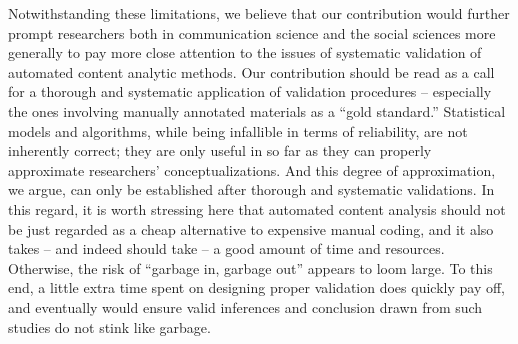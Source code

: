\documentclass[man, floatsintext, 12pt, a4paper, noextraspace]{apa6}
\begin{document}
    Notwithstanding these limitations, we believe that our contribution would further prompt researchers both in communication science and the social sciences more generally to pay more close attention to the issues of systematic validation of automated content analytic methods. Our contribution should be read as a call for a thorough and systematic application of validation procedures -- especially the ones involving manually annotated materials as a \enquote{gold standard.} Statistical models and algorithms, while being infallible in terms of reliability, are not inherently correct; they are only useful in so far as they can properly approximate researchers' conceptualizations. And this degree of approximation, we argue, can only be established after thorough and systematic validations. In this regard, it is worth stressing here that automated content analysis should not be just regarded as a cheap alternative to expensive manual coding, and it also takes -- and indeed should take -- a good amount of time and resources. Otherwise, the risk of “garbage in, garbage out” appears to loom large. To this end, a little extra time spent on designing proper validation does quickly pay off, and eventually would ensure valid inferences and conclusion drawn from such studies do not stink like garbage. 

\printbibliography
%
\end{document}
